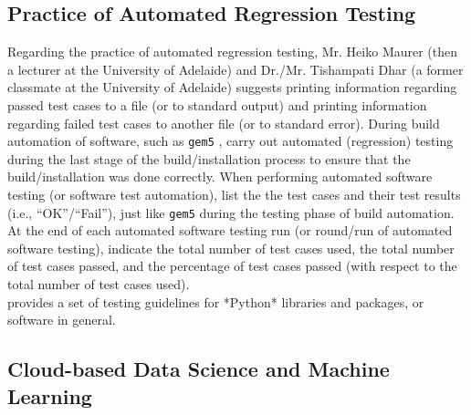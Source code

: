 \documentclass[letter,12pt]{article}
\begin{document}








\subsection{Practice of Automated Regression Testing}
\label{ssec:PracticeOfAutomatedRegressionTesting}

Regarding the practice of automated regression testing, Mr. Heiko Maurer (then a lecturer at the University of Adelaide) and Dr./Mr. Tishampati Dhar (a former classmate at the University of Adelaide) suggests printing information regarding passed test cases to a file (or to standard output) and printing information regarding failed test cases to another file (or to standard error). During build automation of software, such as {\tt gem5} \cite{gem5developers2014,Binkert2011}, carry out automated (regression) testing during the last stage of the build/installation process to ensure that the build/installation was done correctly. When performing automated software testing (or software test automation), list the the test cases and their test results (i.e., ``OK''/``Fail''), just like {\tt gem5} during the testing phase of build automation. At the end of each automated software testing run (or round/run of automated software testing), indicate the total number of test cases used, the total number of test cases passed, and the percentage of test cases passed (with respect to the total number of test cases used). \\


\cite[\S Testing Guidelines]{TheSciPyCommunity2019c} provides a set of testing guidelines for *Python* libraries and packages, or software in general.





\subsection{Cloud-based Data Science and Machine Learning}
\label{ssec:CloudBasedDataScienceAndMachineLearning}
\end{document}
